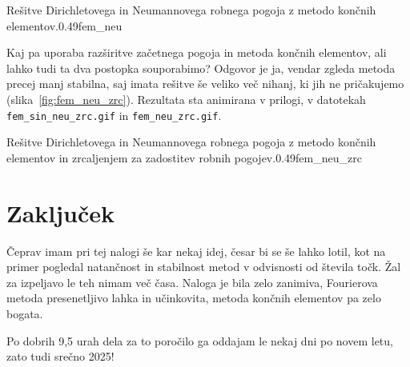 \documentclass{porocilo}
\begin{document}
\begin{multifig}{2}{Rešitve Dirichletovega in Neumannovega robnega pogoja z metodo končnih elementov.}{0.49}{fem_neu}
\end{multifig}

Kaj pa uporaba razširitve začetnega pogoja in metoda končnih elementov, ali lahko tudi ta dva postopka souporabimo? Odgovor je ja, vendar zgleda metoda precej manj stabilna, saj imata rešitve še veliko več nihanj, ki jih ne pričakujemo (slika~\ref{fig:fem_neu_zrc}). Rezultata sta animirana v prilogi, v datotekah \texttt{fem\_sin\_neu\_zrc.gif} in \texttt{fem\_neu\_zrc.gif}.

\begin{multifig}{2}{Rešitve Dirichletovega in Neumannovega robnega pogoja z metodo končnih elementov in zrcaljenjem za zadostitev robnih pogojev.}{0.49}{fem_neu_zrc}
\end{multifig}

\newpage
\section{Zaključek}
Čeprav imam pri tej nalogi še kar nekaj idej, česar bi se še lahko lotil, kot na primer pogledal natančnost in stabilnost metod v odvisnosti od števila točk. Žal za izpeljavo le teh nimam več časa. Naloga je bila zelo zanimiva, Fourierova metoda presenetljivo lahka in učinkovita, metoda končnih elementov pa zelo bogata.

Po dobrih 9,5 urah dela za to poročilo ga oddajam le nekaj dni po novem letu, zato tudi srečno 2025!


\end{document}
